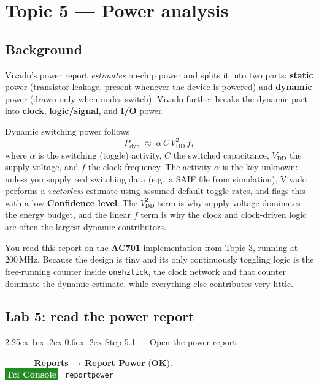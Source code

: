 \documentclass[11pt]{article}
\makeatletter
\newcommand{\guitag}{\colorbox{tudelft}{\textcolor{white}{\footnotesize\bfseries\,GUI\,}}}
\newcommand{\tcltag}{\colorbox{ForestGreen}{\textcolor{white}{\footnotesize\bfseries\,Tcl Console\,}}}
\newcommand{\nav}[1]{\textsf{\textbf{#1}}}
\newcommand{\gto}{\,$\rightarrow$\,\allowbreak}
\renewcommand{\_}{\textunderscore\allowbreak}
\renewcommand\paragraph{\@startsection{paragraph}{4}{\z@}%
  {2.25ex \@plus 1ex \@minus .2ex}%
  {0.6ex \@plus .2ex}%
  {\normalfont\normalsize\bfseries}}
\makeatother
\begin{document}
\newpage
\section{Topic 5 --- Power analysis}

\subsection{Background}
Vivado's power report \emph{estimates} on-chip power and splits it into two parts:
\textbf{static} power (transistor leakage, present whenever the device is powered)
and \textbf{dynamic} power (drawn only when nodes switch). Vivado further breaks the
dynamic part into \textbf{clock}, \textbf{logic/signal}, and \textbf{I/O} power.

Dynamic switching power follows
\[
  P_{\mathrm{dyn}} \;\approx\; \alpha\, C\, V_{\mathrm{DD}}^{2}\, f,
\]
where $\alpha$ is the switching (toggle) activity, $C$ the switched capacitance,
$V_{\mathrm{DD}}$ the supply voltage, and $f$ the clock frequency. The activity
$\alpha$ is the key unknown: unless you supply real switching data (e.g.\ a SAIF
file from simulation), Vivado performs a \emph{vectorless} estimate using assumed
default toggle rates, and flags this with a low \nav{Confidence level}. The
$V_{\mathrm{DD}}^{2}$ term is why supply voltage dominates the energy budget, and
the linear $f$ term is why the clock and clock-driven logic are often the largest
dynamic contributors.

You read this report on the \textbf{AC701} implementation from Topic 3, running at 200\,MHz. Because the
design is tiny and its only continuously toggling logic is the free-running counter inside
\texttt{one\_hz\_tick}, the clock network and that counter dominate the dynamic estimate, while everything
else contributes very little.

\subsection{Lab 5: read the power report}

\paragraph{Step 5.1 --- Open the power report.}

\guitag~ \nav{Reports}\gto\nav{Report Power} (\nav{OK}).\\
\tcltag~ \texttt{report\_power}\\
\end{document}
